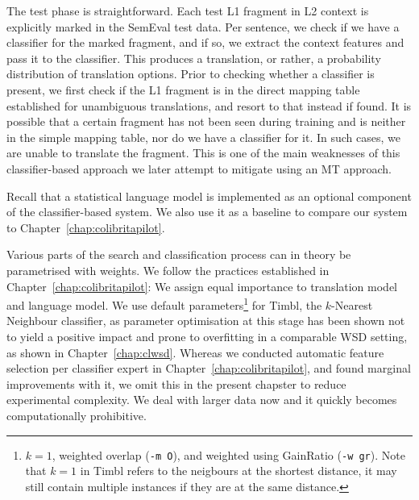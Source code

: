 
The test phase is straightforward. Each test L1 fragment in L2 context
is explicitly marked in the SemEval test data. Per sentence, we check
if we have a classifier for the marked fragment, and if so, we extract
the context features and pass it to the classifier. This produces a
translation, or rather, a probability distribution of translation
options. Prior to checking whether a classifier is present, we first
check if the L1 fragment is in the direct mapping table established
for unambiguous translations, and resort to that instead if found. It
is possible that a certain fragment has not been seen during training
and is neither in the simple mapping table, nor do we have a
classifier for it. In such cases, we are unable to translate the
fragment. This is one of the main weaknesses of this classifier-based
approach we later attempt to mitigate using an MT approach.

Recall that a statistical language model is implemented as an optional component
of the classifier-based system. We also use it as a baseline to compare our
system to Chapter~\ref{chap:colibritapilot}.

Various parts of the search and classification process can in theory be
parametrised with weights. We follow the practices established in
Chapter~\ref{chap:colibritapilot}: We assign equal importance to translation
model and language model. We use default parameters\footnote{$k=1$, weighted
    overlap (\texttt{-m O}), and weighted using GainRatio (\texttt{-w gr}).
Note that $k=1$ in Timbl refers to the neigbours at the shortest distance, it
may still contain multiple instances if they are at the same distance.} for
Timbl, the $k$-Nearest Neighbour classifier, as parameter optimisation at this
stage has been shown not to yield a positive impact and prone to overfitting in
a comparable WSD setting, as shown in Chapter~\ref{chap:clwsd}. Whereas we
conducted automatic feature selection per classifier expert in
Chapter~\ref{chap:colibritapilot}, and found marginal
improvements with it, we omit this in the present chapster to reduce
experimental complexity. We deal with larger data now and it quickly becomes
computationally prohibitive.

